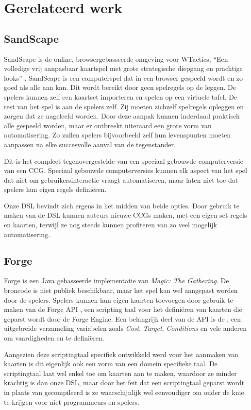 \chapter{Gerelateerd werk}

\section{SandScape}
SandScape \cite{sandscape} is de online, browsergebasseerde omgeving voor WTactics, ``Een volledige vrij aanpasbaar kaartspel met grote strategische diepgang en prachtige looks'' \cite{wtactics}. SandScape is een computerspel dat in een browser gespeeld wordt en zo goed als alle  aan kan. Dit wordt bereikt door geen spelregels op de leggen. De spelers kunnen zelf een kaartset importeren en spelen op een virtuele tafel. De rest van het spel is aan de spelers zelf. Zij moeten zichzelf spelregels opleggen en zorgen dat ze nageleefd worden. Door deze aanpak kunnen inderdaad praktisch alle  gespeeld worden, maar er ontbreekt uiteraard een grote vorm van automatisering. Zo zullen spelers bijvoorbeeld zelf hun levenspunten moeten aanpassen na elke succesvolle aanval van de tegenstander.

Dit is het compleet tegenovergestelde van een speciaal gebouwde computerversie van een CCG. Speciaal gebouwde computerversies kunnen elk aspect van het spel dat niet om gebruikersinteractie vraagt automatiseren, maar laten niet toe dat spelers hun eigen regels defini\"eren.

Onze DSL bevindt zich ergens in het midden van beide opties. Door gebruik te maken van de DSL kunnen auteurs nieuwe CCGs maken, met een eigen set regels en kaarten, terwijl ze nog steeds kunnen profiteren van zo veel mogelijk automatisering.

\section{Forge}
Forge \cite{forge} is een Java gebasseerde implementatie van \textit{Magic: The Gathering}. De broncode is niet publiek beschikbaar, maar het spel kan wel aangepast worden door de spelers. Spelers kunnen hun eigen kaarten toevoegen door gebruik te maken van de Forge API \cite{forge-api}, een scripting taal voor het defini\"eren van kaarten die geparst wordt door de Forge Engine. Een belangrijk deel van de API is de , een uitgebreide verzameling variabelen zoals \textit{Cost}, \textit{Target}, \textit{Conditions} en vele anderen om vaardigheden en  te defini\"eren.

Aangezien deze scriptingtaal specifiek ontwikkeld werd voor het aanmaken van  kaarten is dit eigenlijk ook een vorm van een domein specifieke taal. De scriptingtaal laat wel enkel toe om kaarten aan te maken, waardoor ze minder krachtig is dan onze DSL, maar door het feit dat een scriptingtaal geparst wordt in plaats van gecompileerd is ze waarschijnlijk wel eenvoudiger om onder de knie te krijgen voor niet-programmeurs en spelers.